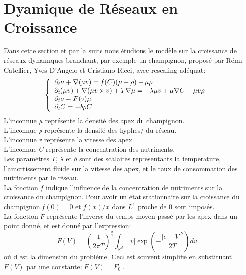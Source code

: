 \documentclass[11pt]{article}
\begin{document}
\section{Dyamique de Réseaux en Croissance}
Dans cette section et par la suite nous étudions le modèle sur la croissance de réseaux dynamiques branchant, par exemple un champignon, proposé par Rémi Catellier, Yves D'Angelo et Cristiano Ricci, avec rescaling adéquat:
\begin{equation}\label{eq:BDNG}  \left\{
                \begin{array}{ll}
                \partial_t\mu + \nabla(\mu v) = f(C)(\mu + \rho) -\mu\rho \\
                   \partial_t(\mu v)+\nabla(\mu v\times v) +T\nabla\mu=-\lambda\mu v+\mu\nabla C-\mu v \rho \\
                 \partial_t\rho=  F(v) \mu \\
                  \partial_t C = -b\rho C
                \end{array}
              \right.
\end{equation} 
L'inconnue $\mu$ représente la densité des apex du champignon.\\
L'inconnue $\rho$ représente la densité des hyphes/ du réseau.\\
L'inconnue $v$ représente la vitesse des apex.\\
L'inconnue $C$ représente la concentration des nutriments.\\
Les paramètres $T$, $\lambda$ et $b$ sont des scalaires représentants la température, l'amortissement fluide sur la vitesse des apex, et le taux de consommation des nutriments par le réseau.\\
La fonction $f$ indique l'influence de la concentration de nutriments sur la croissance du champignon. Pour avoir un état stationnaire sur la croissance du champignon,$f(0)=0$ et $f(x)/x$ dans $L^1$ proche de 0 sont imposés.\\
La fonction $F$ représente l'inverse du temps moyen passé par les apex dans un point donné, et est donné par l'expression:
\begin{equation}
	F(V)=(\frac{1}{2\pi T})^\frac{d}{2}\int_{\mathbb{R}^d} |v|\exp(-\frac{|v-V|^2}{2T})dv\end{equation}
où d est la dimension du problème. Ceci est souvent simplifié en substituant $F(V)$ par une constante: $F(V)= F_0$ .\\
\end{document}
